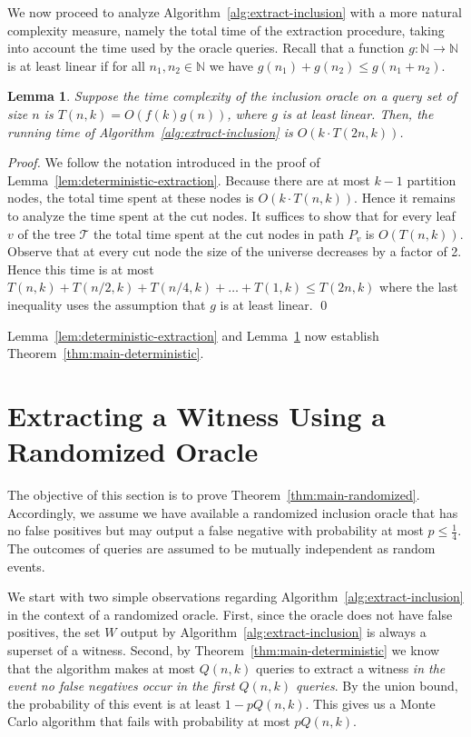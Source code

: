 \documentclass[11pt]{article}
\newtheorem{lemma}[theorem]{Lemma}
\begin{document}
We now proceed to analyze Algorithm~\ref{alg:extract-inclusion} with a more natural complexity measure, namely the total time of the extraction procedure, taking into account the time used by the oracle queries. Recall that a function $g:\mathbb{N}\rightarrow\mathbb{N}$ is at least linear if for all $n_1,n_2\in\mathbb{N}$ we have $g(n_1)+g(n_2)\leq g(n_1+n_2)$.

\begin{lemma}
\label{lem:deterministic-extract-runtime}
Suppose the time complexity of the inclusion oracle on a query set of size $n$ 
is $T(n,k)=O(f(k)g(n))$, where $g$ is at least linear.
Then, the running time of Algorithm~\ref{alg:extract-inclusion} 
is $O(k\cdot T(2n,k))$.
\end{lemma}

\begin{proof}
We follow the notation introduced in the proof of Lemma~\ref{lem:deterministic-extraction}. Because there are at most $k-1$ partition nodes, the total time spent at these nodes is $O(k\cdot T(n,k))$. Hence it remains to analyze the time spent at the cut nodes. It suffices to show that for every leaf $v$ of the tree $\mathcal{T}$ the total time spent at the cut nodes in path $P_v$ is $O(T(n,k))$. Observe that at every cut node the size of the universe decreases by a factor of 2. Hence this time is at most $T(n,k)+T(n/2,k)+T(n/4,k)+\ldots+T(1,k)\leq T(2n,k)$ where the last inequality uses the assumption that $g$ is at least linear. \qed
\end{proof}

Lemma~\ref{lem:deterministic-extraction} and 
Lemma~\ref{lem:deterministic-extract-runtime}
now establish Theorem~\ref{thm:main-deterministic}.



\section{Extracting a Witness Using a Randomized Oracle}
\label{sect:randomized}

The objective of this section is to prove Theorem~\ref{thm:main-randomized}. Accordingly, we assume we have available a randomized inclusion oracle that has no false positives but may output a false negative with probability at most $p\leq \frac{1}4$. The outcomes of queries are assumed to be mutually independent as random events.

We start with two simple observations regarding Algorithm~\ref{alg:extract-inclusion} in the context of a randomized oracle. First, since the oracle does not have false positives, the set $W$ output by Algorithm~\ref{alg:extract-inclusion} is always a superset of a witness. Second, by Theorem~\ref{thm:main-deterministic} we know that the algorithm makes at most $Q(n,k)$ queries to extract a witness {\em in the event no false negatives occur in the first $Q(n,k)$ queries}. By the union bound, the probability of this event is at least $1-pQ(n,k)$. This gives us a Monte Carlo algorithm that fails with probability at most $pQ(n,k)$. 
\end{document}
